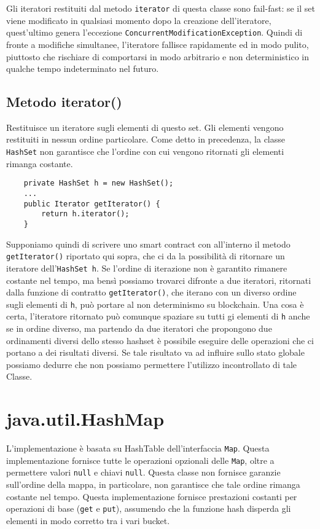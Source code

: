 		Gli iteratori restituiti dal metodo \lstinline|iterator| di questa classe sono fail-fast: se il set viene modificato in qualsiasi momento dopo la creazione dell'iteratore, quest'ultimo genera l'eccezione \lstinline|ConcurrentModificationException|. Quindi di fronte a modifiche simultanee, l'iteratore fallisce rapidamente ed in modo pulito, piuttosto che rischiare di comportarsi in modo arbitrario e non deterministico in qualche tempo indeterminato nel futuro.
		
		\subsection{Metodo iterator()}
			Restituisce un iteratore sugli elementi di questo set. Gli elementi vengono restituiti in nessun ordine particolare. Come detto in precedenza, la classe \lstinline|HashSet| non garantisce che l'ordine con cui vengono ritornati gli elementi rimanga costante.
			\begin{lstlisting}
	private HashSet h = new HashSet(); 
	...
	public Iterator getIterator() { 
		return h.iterator();
	}
			\end{lstlisting}
			Supponiamo quindi di scrivere uno smart contract con all'interno il metodo \lstinline|getIterator()| riportato qui sopra, che ci da la possibilità di ritornare un iteratore dell'\lstinline|HashSet h|. Se l'ordine di iterazione non è garantito rimanere costante nel tempo, ma bensì possiamo trovarci difronte a due iteratori, ritornati dalla funzione di contratto \lstinline|getIterator()|, che iterano con un diverso ordine sugli elementi di \lstinline|h|, può portare al non determinismo su blockchain. Una cosa è certa, l'iteratore ritornato può comunque spaziare su tutti gi elementi di \lstinline|h| anche se in ordine diverso, ma partendo da due iteratori che propongono due ordinamenti diversi dello stesso hashset è possibile eseguire delle operazioni che ci portano a dei risultati diversi. Se tale risultato va ad influire sullo stato globale possiamo dedurre che non possiamo permettere l'utilizzo incontrollato di tale Classe.
					
	\section{java.util.HashMap}
		L'implementazione è basata su HashTable dell'interfaccia \lstinline|Map|. Questa implementazione fornisce tutte le operazioni opzionali delle \lstinline|Map|, oltre a permettere valori \lstinline|null| e chiavi \lstinline|null|. Questa classe non fornisce garanzie sull'ordine della mappa, in particolare, non garantisce che tale ordine rimanga costante nel tempo. Questa implementazione fornisce prestazioni costanti per operazioni di base (\lstinline|get| e \lstinline|put|), assumendo che la funzione hash disperda gli elementi in modo corretto tra i vari bucket.
			
